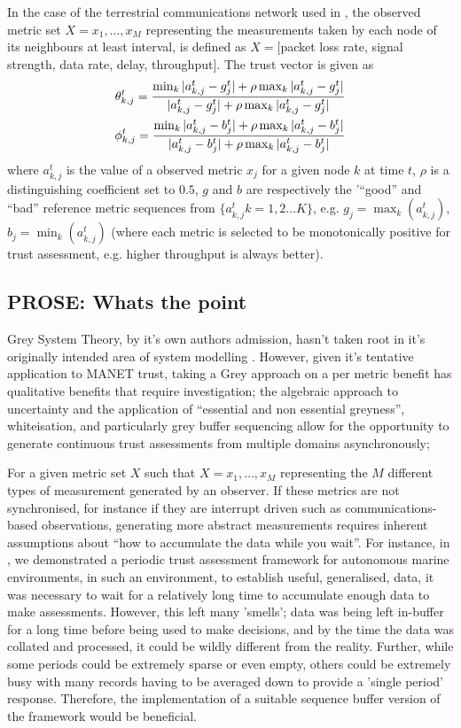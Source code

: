 \documentclass[conference]{IEEEtran}
\begin{document}
In the case of the terrestrial communications network used in \cite{Guo11}, the observed metric set $X = {x_1,\dots,x_M}$ representing the measurements taken by each node of its neighbours at least interval, is defined as $X=[$packet loss rate, signal strength, data rate, delay, throughput$]$.
The trust vector is given as
%
\begin{align}
  \label{eq:grc}
  \theta_{k,j}^t = \frac{\min_k|a_{k,j}^t - g_j^t| + \rho \max_k|a_{k,j}^t-g_j^t|}{|a_{k,j}^t-g_j^t| + \rho \max_k|a_{k,j}^t-g_j^t|} \\
  \phi_{k,j}^t = \frac{\min_k|a_{k,j}^t - b_j^t| + \rho \max_k|a_{k,j}^t-b_j^t|}{|a_{k,j}^t-b_j^t| + \rho \max_k|a_{k,j}^t-b_j^t|} \notag 
\end{align}
%
where $a_{k,j}^t$ is the value of a observed metric $x_j$ for a given node $k$ at time $t$, $\rho$ is a distinguishing coefficient set to $0.5$, $g$ and $b$ are respectively the '``good'' and ``bad'' reference metric sequences from $\{a_{k,j}^t k=1,2\dots K\}$, e.g. $g_j=\max_k({a_{k,j}^t})$,  $b_j=\min_k({a_{k,j}^t})$ (where each metric is selected to be monotonically positive for trust assessment, e.g. higher throughput is always better). 

\subsection{PROSE: Whats the point}

Grey System Theory, by it's own authors admission, hasn't taken root in it's originally intended area of system modelling \cite{Liu11}.
However, given it's tentative application to MANET trust, taking a Grey approach on a per metric benefit has qualitative benefits that require investigation; the algebraic approach to uncertainty and the application of ``essential and non essential greyness'', whiteisation, and particularly grey buffer sequencing allow for the opportunity to generate continuous trust assessments from multiple domains asynchronously;

For a given metric set $X$ such that $X = {x_1,\dots,x_M}$ representing the $M$ different types of measurement generated by an observer. If these metrics are not synchronised, for instance if they are interrupt driven such as communications-based observations, generating more abstract measurements requires inherent assumptions about ``how to accumulate the data while you wait''. For instance, in \cite{Bolster2015}, we demonstrated a periodic trust assessment framework for autonomous marine environments, in such an environment, to establish useful, generalised, data, it was necessary to wait for a relatively long time to accumulate enough data to make assessments.
However, this left many 'smells'; data was being left in-buffer for a long time before being used to make decisions, and by the time the data was collated and processed, it could be wildly different from the reality. Further, while some periods could be extremely sparse or even empty, others could be extremely busy with many records having to be averaged down to provide a 'single period' response. 
Therefore, the implementation of a suitable sequence buffer version of the framework would be beneficial.
\end{document}

